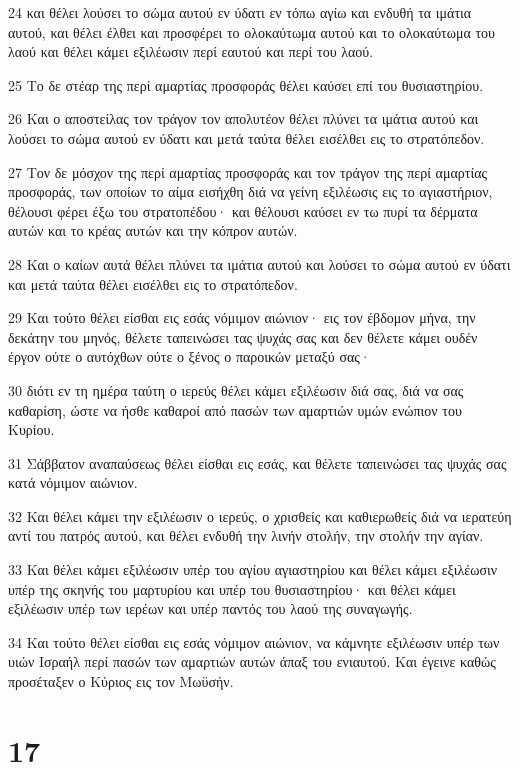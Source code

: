 \par 24 και θέλει λούσει το σώμα αυτού εν ύδατι εν τόπω αγίω και ενδυθή τα ιμάτια αυτού, και θέλει έλθει και προσφέρει το ολοκαύτωμα αυτού και το ολοκαύτωμα του λαού και θέλει κάμει εξιλέωσιν περί εαυτού και περί του λαού.
\par 25 Το δε στέαρ της περί αμαρτίας προσφοράς θέλει καύσει επί του θυσιαστηρίου.
\par 26 Και ο αποστείλας τον τράγον τον απολυτέον θέλει πλύνει τα ιμάτια αυτού και λούσει το σώμα αυτού εν ύδατι και μετά ταύτα θέλει εισέλθει εις το στρατόπεδον.
\par 27 Τον δε μόσχον της περί αμαρτίας προσφοράς και τον τράγον της περί αμαρτίας προσφοράς, των οποίων το αίμα εισήχθη διά να γείνη εξιλέωσις εις το αγιαστήριον, θέλουσι φέρει έξω του στρατοπέδου· και θέλουσι καύσει εν τω πυρί τα δέρματα αυτών και το κρέας αυτών και την κόπρον αυτών.
\par 28 Και ο καίων αυτά θέλει πλύνει τα ιμάτια αυτού και λούσει το σώμα αυτού εν ύδατι και μετά ταύτα θέλει εισέλθει εις το στρατόπεδον.
\par 29 Και τούτο θέλει είσθαι εις εσάς νόμιμον αιώνιον· εις τον έβδομον μήνα, την δεκάτην του μηνός, θέλετε ταπεινώσει τας ψυχάς σας και δεν θέλετε κάμει ουδέν έργον ούτε ο αυτόχθων ούτε ο ξένος ο παροικών μεταξύ σας·
\par 30 διότι εν τη ημέρα ταύτη ο ιερεύς θέλει κάμει εξιλέωσιν διά σας, διά να σας καθαρίση, ώστε να ήσθε καθαροί από πασών των αμαρτιών υμών ενώπιον του Κυρίου.
\par 31 Σάββατον αναπαύσεως θέλει είσθαι εις εσάς, και θέλετε ταπεινώσει τας ψυχάς σας κατά νόμιμον αιώνιον.
\par 32 Και θέλει κάμει την εξιλέωσιν ο ιερεύς, ο χρισθείς και καθιερωθείς διά να ιερατεύη αντί του πατρός αυτού, και θέλει ενδυθή την λινήν στολήν, την στολήν την αγίαν.
\par 33 Και θέλει κάμει εξιλέωσιν υπέρ του αγίου αγιαστηρίου και θέλει κάμει εξιλέωσιν υπέρ της σκηνής του μαρτυρίου και υπέρ του θυσιαστηρίου· και θέλει κάμει εξιλέωσιν υπέρ των ιερέων και υπέρ παντός του λαού της συναγωγής.
\par 34 Και τούτο θέλει είσθαι εις εσάς νόμιμον αιώνιον, να κάμνητε εξιλέωσιν υπέρ των υιών Ισραήλ περί πασών των αμαρτιών αυτών άπαξ του ενιαυτού. Και έγεινε καθώς προσέταξεν ο Κύριος εις τον Μωϋσήν.

\chapter{17}

